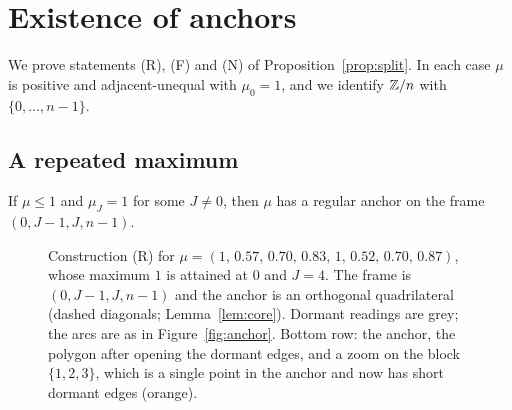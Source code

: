 \section{Existence of anchors}\label{sec:constructions}

We prove statements (R), (F) and (N) of Proposition~\ref{prop:split}. In
each case $\mu$ is positive and adjacent-unequal with $\mu_0=1$, and we
identify $\mathbb{Z}/n$ with $\{0,\dots,n-1\}$.

\subsection{A repeated maximum}

\begin{proposition}[Statement (R)]\label{prop:R}
If $\mu\le1$ and $\mu_J=1$ for some $J\ne0$, then $\mu$ has a regular anchor
on the frame $(0,J-1,J,n-1)$.
\end{proposition}

\begin{figure}[t]
\centering
{}
\caption{Construction (R) for
$\mu=(1,\allowbreak\,0.57,\allowbreak\,0.70,\allowbreak\,0.83,\allowbreak\,1,\allowbreak\,0.52,\allowbreak\,0.70,\allowbreak\,0.87)$, whose maximum $1$ is
attained at $0$ and $J=4$. The frame is $(0,J-1,J,n-1)$ and the anchor is an
orthogonal quadrilateral (dashed diagonals; Lemma~\ref{lem:core}). Dormant
readings are grey; the arcs are as in Figure~\ref{fig:anchor}. Bottom row: the anchor, the polygon after
opening the dormant edges, and a zoom on the block $\{1,2,3\}$, which is a
single point in the anchor and now has short dormant edges (orange).}
\label{fig:R}
\end{figure}

